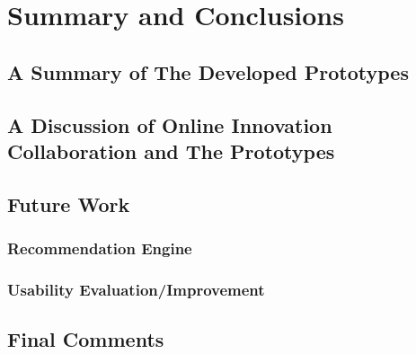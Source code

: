 \chapter{Summary and Conclusions}

\section{A Summary of The Developed Prototypes}

\section{A Discussion of Online Innovation Collaboration and The Prototypes}

\section{Future Work}

\subsection{Recommendation Engine}

\subsection{Usability Evaluation/Improvement}

\section{Final Comments}